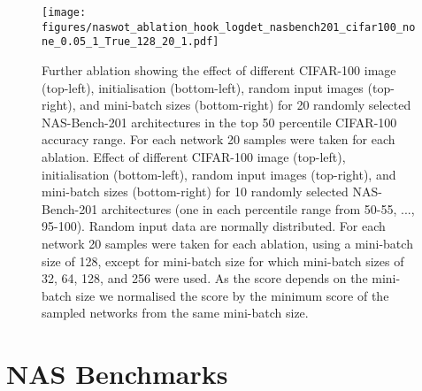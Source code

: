 \documentclass{article}
\begin{document}
\begin{figure}[!h]
    \centering
    \texttt{[image: figures/naswot\_ablation\_hook\_logdet\_nasbench201\_cifar100\_none\_0.05\_1\_True\_128\_20\_1.pdf]}
  \caption{Further ablation showing the effect of different CIFAR-100 image (top-left), initialisation (bottom-left), random input images (top-right), and mini-batch sizes (bottom-right) for 20 randomly selected NAS-Bench-201 architectures in the top 50 percentile CIFAR-100 accuracy range. For each network 20 samples were taken for each ablation.
  Effect of different CIFAR-100 image (top-left), initialisation (bottom-left), random input images (top-right), and mini-batch sizes (bottom-right) for 10 randomly selected NAS-Bench-201 architectures (one in each  percentile range from 50-55, ..., 95-100). Random input data are normally distributed. For each network 20 samples were taken for each ablation, using a mini-batch size of 128, except for mini-batch size for which mini-batch sizes of 32, 64, 128, and 256 were used. As the score depends on the mini-batch size we normalised the score by the minimum score of the sampled networks from the same mini-batch size.
  }
    \label{fig:ablationscore}  
\end{figure}

\FloatBarrier
\section{NAS Benchmarks}
\label{appendix:nasbench}
\end{document}
